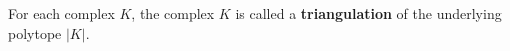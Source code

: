 For each complex $K$, the complex $K$ is called a \textbf{triangulation} of the underlying polytope $|K|$.
